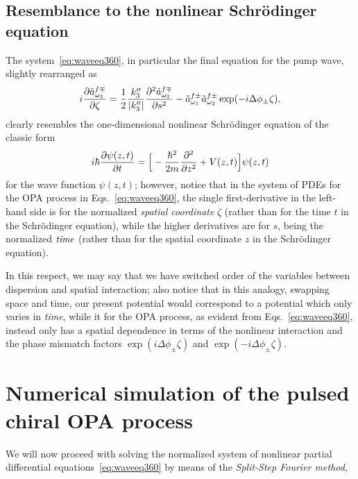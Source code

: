 \subsection{Resemblance to the nonlinear Schr\"odinger equation}
The system~\eqref{eq:waveeq360}, in particular the final equation for the
pump wave, slightly rearranged as
$$
  i{{\partial\tilde{a}^{f\mp}_{\omega_3}}\over{\partial\zeta}}
    ={{1}\over{2}}{{k''_3}\over{|k''_3|}}
     {{\partial^2\tilde{a}^{f\mp}_{\omega_3}}\over{\partial s^2}}
    -\tilde{a}^{f\pm}_{\omega_1} \tilde{a}^{f\pm}_{\omega_2}
       \exp(-i\Delta\phi_{\pm}\zeta),
$$
clearly resembles the one-dimensional nonlinear Schr\"odinger equation of the
classic form
$$
  i\hbar{{\partial\psi(z,t)}\over{\partial t}}
    =\Big[-{{\hbar^2}\over{2m}}{{\partial^2}\over{\partial z^2}}
       +V(z,t)\Big]\psi(z,t)
$$
for the wave function $\psi(z,t)$; however, notice that in the system of PDEs
for the OPA process in Eqs.~\eqref{eq:waveeq360}, the single first-derivative
in the left-hand side is for the normalized {\it spatial coordinate} $\zeta$
(rather than for the time $t$ in the Schr\"odinger equation), while the higher
derivatives are for $s$, being the normalized ${\it time}$ (rather than for
the spatial coordinate $z$ in the Schr\"odinger equation).

In this respect, we may say that we have switched order of the variables
between dispersion and spatial interaction; also notice that in this analogy,
swapping space and time, our present potential would correspond to a potential
which only varies in {\it time}, while it for the OPA process, as evident from
Eqs.~\eqref{eq:waveeq360}, instead only has a spatial dependence in terms of
the nonlinear interaction and the phase mismatch factors
$\exp(i\Delta\phi_{\pm}\zeta)$ and $\exp(-i\Delta\phi_{\pm}\zeta)$.

\section{Numerical simulation of the pulsed chiral OPA process}
We will now proceed with solving the normalized system of nonlinear partial
differential equations~\eqref{eq:waveeq360} by means of the {\it Split-Step
Fourier method},%

